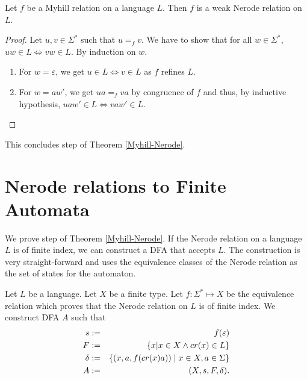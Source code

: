 \begin{theorem}
    \label{myhill_suffix}
    Let $f$ be a Myhill relation on a language $L$.
    Then $f$ is a weak Nerode relation on $L$.
\end{theorem}
\begin{proof}
    Let $u, v \in \Sigma^*$ such that $u =_f v$. We have to show that for all $w \in \Sigma^*$, $u w \in L \Leftrightarrow v w \in L$.
    By induction on $w$.
    \begin{enumerate}
        \item For $w = \varepsilon$, we get $u \in L \Leftrightarrow v \in L$ as $f$ refines $L$.
        \item For $w = aw'$, we get $ua =_f va$ by congruence of $f$ and thus, by inductive hypothesis, $uaw' \in L \Leftrightarrow vaw' \in L$.
    \end{enumerate}
\end{proof}



This concludes step  of Theorem \ref{Myhill-Nerode}.

\section{Nerode relations to Finite Automata}
We prove step  of Theorem \ref{Myhill-Nerode}. 
If the Nerode relation on a language $L$ is of finite index, we can construct a DFA that accepts $L$.
The construction is very straight-forward and uses the equivalence classes of the Nerode relation as the set of states for the automaton.

\begin{definition}
    \label{nerode_to_dfa} 
    Let $L$ be a language. Let $X$ be a finite type. Let $f: \Sigma^* \mapsto X$ be the equivalence relation which proves that the Nerode relation on $L$ is of finite index.
    We construct DFA $A$ such that
\begin{eqnarray*}
    s & := & f(\varepsilon) \\
    F & := & \{ x | x \in X \wedge cr(x) \in L \} \\
    \delta & := & \{ (x, a, f(cr(x) a)) \; | \; x \in X, a \in \Sigma \} \\
    A &:=&  (X, s, F, \delta).
\end{eqnarray*}
\end{definition}

